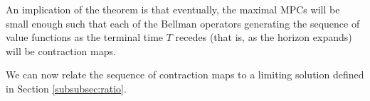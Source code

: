 \documentclass[BufferStockTheory]{subfiles}
\begin{document}
An implication of the theorem is that eventually, the maximal MPCs will be small enough such that each of the Bellman operators generating the sequence of value functions as the terminal time $T$ recedes (that is, as the horizon expands) will be contraction maps. 
\begin{comment}
The proof is provided in the appendix and we discuss two key arguments of the proof here. First, the proof shows that $\boundFunc$ satisfies the conditions of Boyd's Contraction Mapping Theorem if we use the weighting function:
%
\begin{equation}
\boundFunc(x) = \bar{M} + x^{1-\gamma},
\end{equation}
%
where $\bar{M}$ is a constant derived from the model primitives and the upper and bound on the consumption share. Intuitively, Boyd's theorem shows that if one can find a $\boundFunc$ that is everywhere finite but goes to infinity `as fast or faster' than the function you are normalizing with $\boundFunc$, the normalized problem defines a contraction mapping. 
\end{comment} 
We can now relate the sequence of contraction maps to a limiting solution defined in Section \ref{subsubsec:ratio}.  
\end{document}
